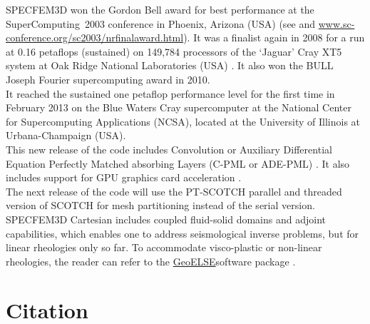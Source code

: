 SPECFEM3D won the Gordon Bell award for best performance at the SuperComputing~2003
conference in Phoenix, Arizona (USA) (see \citet{KoTsChTr03} and
\url{www.sc-conference.org/sc2003/nrfinalaward.html}). It was a finalist
again in 2008 for a run at 0.16 petaflops (sustained) on 149,784 processors
of the `Jaguar' Cray XT5 system at Oak Ridge National Laboratories
(USA) \citep{CaKoLaTiMiLeSnTr08}. It also won the BULL Joseph Fourier
supercomputing award in 2010.\\

It reached the sustained one petaflop performance level for the first time in February 2013
on the Blue Waters Cray supercomputer at the National Center for Supercomputing Applications (NCSA), located at the University of Illinois at Urbana-Champaign (USA).\\


This new release of the code includes Convolution or
Auxiliary Differential Equation Perfectly Matched absorbing Layers
(C-PML or ADE-PML) \citep{MaKoEz08,MaKoGe08,MaKo09,MaKoGeBr10,KoMa07}.
It also includes support for GPU graphics card acceleration \citep{Kom11,MiKo10,KoMiEr09,KoErGoMi10}.\\


The next release of the code will use the PT-SCOTCH parallel and threaded
version of SCOTCH for mesh partitioning instead of the serial version.\\


SPECFEM3D Cartesian includes coupled fluid-solid domains and adjoint
capabilities, which enables one to address seismological inverse problems,
but for linear rheologies only so far. To accommodate visco-plastic
or non-linear rheologies, the reader can refer to the \href{http://geoelse.stru.polimi.it/}{GeoELSE}software
package \citep{CaGa97,StPaIg09}.


\section{Citation}

